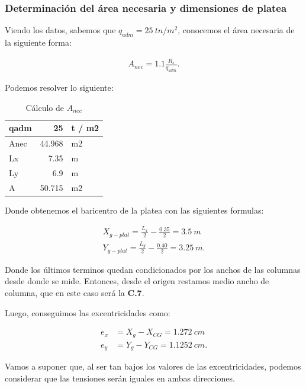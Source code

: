 \documentclass[../main.tex]{subfiles}
\begin{document}
\subsubsection{Determinación del área necesaria y dimensiones de platea}

Viendo los datos, sabemos que $q_{adm}=\SI{25}{tn /m^2}$, conocemos el área
necesaria de la siguiente forma:

\begin{align*}
  A_{nec}= 1.1 \frac{R_s}{q_{adm}} 
.\end{align*}

Podemos resolver lo siguiente:

\begin{table}[htbp]
  \centering
  \caption{Cálculo de $A_{nec}$}
    \begin{tabular}{|l|r|l|}
    \hline
    qadm  & 25    & t / m2 \bigstrut\\
    \hline
    Anec  & 44.968 & m2 \bigstrut\\
    \hline
    Lx    & 7.35  & m \bigstrut\\
    \hline
    Ly    & 6.9   & m \bigstrut\\
    \hline
    A     & 50.715 & m2 \bigstrut\\
    \hline
    \end{tabular}%
  \label{tab:addlabel}%
\end{table}%

Donde obtenemos el baricentro de la platea con las siguientes formulas:

\begin{align*}
  X_{g-plat} = \frac{L_x}{2} - \frac{0.35}{2} = \SI{3.5}{m} \\[5pt]
  Y_{g-plat} = \frac{L_y}{2} - \frac{0.40}{2} = \SI{3.25}{m}
.\end{align*}

Donde los últimos terminos quedan condicionados por los anchos de las columnas
desde donde se mide. Entonces, desde el origen restamos medio ancho de columna,
que en este caso será la \textbf{C.7}.

Luego, conseguimos las excentricidades como:

\begin{align*}
  e_x &= X_g - X_{CG} = \SI{1.272}{cm} \\[5pt]
  e_y &= Y_g - Y_{CG} = \SI{1.1252}{cm}
.\end{align*}

Vamos a suponer que, al ser tan bajos los valores de las excentricidades, podemos
considerar que las tensiones serán iguales en ambas direcciones.
\end{document}
